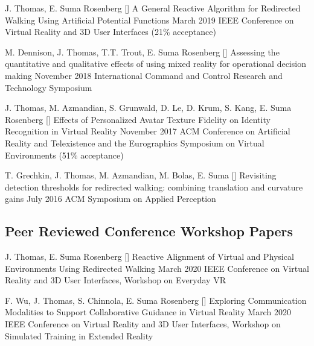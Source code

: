 \begin{cventries}
  \cventry
    {J. Thomas, E. Suma Rosenberg} %
    {[\thenpubs] A General Reactive Algorithm for Redirected Walking Using Artificial Potential Functions} %
    {March 2019} %
    {} %
    {IEEE Conference on Virtual Reality and 3D User Interfaces (21\% acceptance)}
    
  \cventry
    {M. Dennison, J. Thomas, T.T. Trout, E. Suma Rosenberg} %
    {[\thenpubs] Assessing the quantitative and qualitative effects of using mixed reality for operational decision making} %
    {November 2018} %
    {} %
    {International Command and Control Research and Technology Symposium} %
    
  \cventry
    {J. Thomas, M. Azmandian, S. Grunwald, D. Le, D. Krum, S. Kang, E. Suma Rosenberg} %
    {[\thenpubs] Effects of Personalized Avatar Texture Fidelity on Identity Recognition in Virtual Reality} %
    {November 2017} %
    {} %
    {ACM Conference on Artificial Reality and Telexistence and the Eurographics Symposium on Virtual Environments (51\% acceptance)} %
    
  \cventry
    {T. Grechkin, J. Thomas, M. Azmandian, M. Bolas, E. Suma} %
    {[\thenpubs] Revisiting detection thresholds for redirected walking: combining translation and curvature gains} %
    {July 2016} %
    {} %
    {ACM Symposium on Applied Perception} %
    
  \vspace{-.25cm}    
  \subsection*{Peer Reviewed Conference Workshop Papers}
  \cventry
    {J. Thomas, E. Suma Rosenberg} %
    {[\thenpubs] Reactive Alignment of Virtual and Physical Environments Using Redirected Walking} %
    {March 2020} %
    {} %
    {IEEE Conference on Virtual Reality and 3D User Interfaces, Workshop on Everyday VR} %
    
  \cventry
    {F. Wu, J. Thomas, S. Chinnola, E. Suma Rosenberg} %
    {[\thenpubs] Exploring Communication Modalities to Support Collaborative Guidance in Virtual Reality} %
    {March 2020} %
    {} %
    {IEEE Conference on Virtual Reality and 3D User Interfaces, Workshop on Simulated Training in Extended Reality} %
    

\end{cventries}
